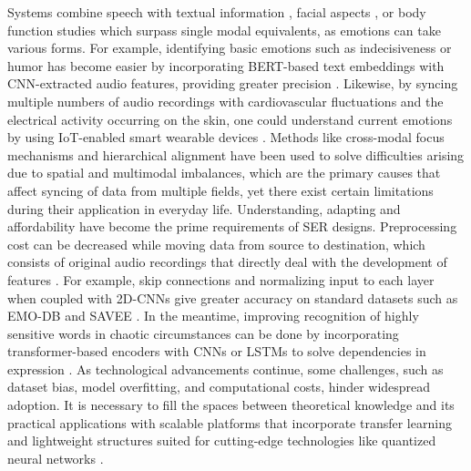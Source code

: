 \documentclass[iicol,sn-mathphys-num]{sn-jnl}%
\theoremstyle{thmstyleone}%
\theoremstyle{thmstyletwo}%
\theoremstyle{thmstylethree}%
\begin{document}
Systems combine speech with textual information \cite{r8}, facial aspects \cite{r2}, or body function studies \cite{r10} which surpass single modal equivalents, as emotions can take various forms. For example, identifying basic emotions such as indecisiveness or humor has become easier by incorporating BERT-based text embeddings with CNN-extracted audio features, providing greater precision \cite{r8}. Likewise, by syncing multiple numbers of audio recordings with cardiovascular fluctuations and the electrical activity occurring on the skin, one could understand current emotions by using IoT-enabled smart wearable devices \cite{r10}. Methods like cross-modal focus mechanisms \cite{r6} and hierarchical alignment \cite{r2} have been used to solve difficulties arising due to spatial and multimodal imbalances, which are the primary causes that affect syncing of data from multiple fields, yet there exist certain limitations during their application in everyday life. Understanding, adapting and affordability have become the prime requirements of SER designs. Preprocessing cost can be decreased while moving data from source to destination, which consists of original audio recordings that directly deal with the development of features \cite{r3}. For example, skip connections and normalizing input to each layer when coupled with 2D-CNNs give greater accuracy on standard datasets such as EMO-DB and SAVEE \cite{r9}. In the meantime, improving recognition of highly sensitive words in chaotic circumstances can be done by incorporating transformer-based encoders with CNNs or LSTMs to solve dependencies in expression \cite{r8}. As technological advancements continue, some challenges, such as dataset bias, model overfitting, and computational costs, hinder widespread adoption. It is necessary to fill the spaces between theoretical knowledge and its practical applications with scalable platforms that incorporate transfer learning \cite{r7} and lightweight structures suited for cutting-edge technologies like quantized neural networks \cite{r10}.
\end{document}
